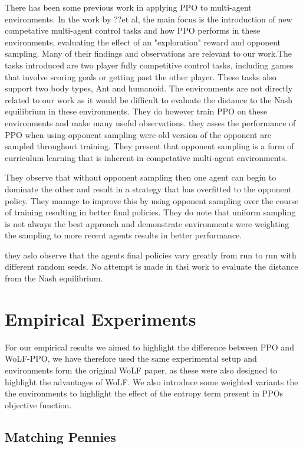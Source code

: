 \documentclass[conference]{IEEEtran}
\begin{document}
There has been some previous work in applying PPO to multi-agent environments. In the work by ??et al, the main focus is the introduction of new competative multi-agent control tasks and how PPO performs in these environments, evaluating the effect of an "exploration" reward and opponent sampling. Many of their findings and observations are relevant to our work.The tasks introduced are two player fully competitive control tasks, including games that involve scoring goals or getting past the other player. These tasks also support two body types, Ant and humanoid. The environments are not directly related to our work as it would be difficult to evaluate the distance to the Nash equilibrium in these environments. They do however train PPO on these environments and make many useful observations. they asses the performance of PPO when using opponent sampling were old version of the opponent are sampled throughout training. They present that opponent sampling is a form of curriculum learning that is inherent in competative multi-agent environments.

They observe that without opponent sampling then one agent can begin to dominate the other and result in a strategy that has overfitted to the opponent policy. They manage to improve this by using opponent sampling over the course of training resulting in better final policies. They do note that uniform sampling is not always the best approach and demonstrate environments were weighting the sampling to more recent agents results in better performance.

they aslo observe that the agents final policies vary greatly from run to run with different random seeds. No attempt is made in thsi work to evaluate the distance from the Nash equilibrium. 

\section{Empirical Experiments}

For our empirical results we aimed to highlight the difference between PPO and WoLF-PPO, we have therefore used the same experimental setup and environments form the original WoLF paper, as these were also designed to highlight the advantages of WoLF. We also introduce some weighted variants the the environments to highlight the effect of the entropy term present in PPOs objective function.

\subsection{Matching Pennies}
\end{document}
